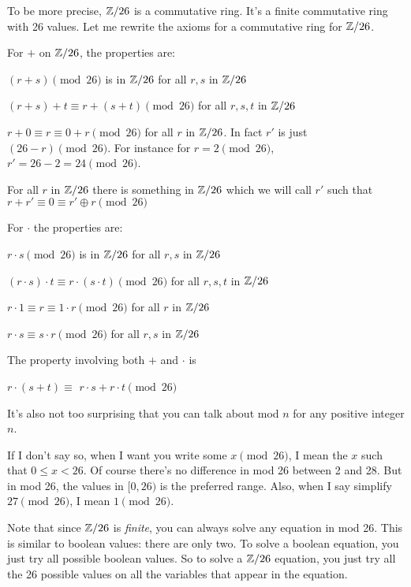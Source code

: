 To be more precise, $\mathbb Z/26$ is a commutative ring.
It's a finite commutative ring with 26 values.
Let me rewrite the axioms for a commutative ring for $\mathbb Z/26$.

For $+$ on $\mathbb Z/26$, the properties are:
\begin{myenum}
\item $(r + s) \pmod{26}$ is in $\mathbb Z/26$ for all $r,s$ in $\mathbb Z/26$
\item 
  $(r + s) + t
  \equiv
  r + (s + t) \pmod{26}$
for all $r,s,t$ in $\mathbb Z/26$
\item
$r + 0 \equiv r \equiv 0 + r \pmod{26}$ 
for all
$r$ in $\mathbb Z/26$.
In fact $r'$ is just $(26 - r) \pmod{26}$.
For instance for $r = 2 \pmod{26}$, $r' = 26 - 2 = 24 \pmod{26}$.
\item For 
all $r$ in $\mathbb Z/26$ there is something in $\mathbb Z/26$ which we will call $r'$
such that $r + r' \equiv 0 \equiv r' \oplus r \pmod{26}$
\end{myenum}

For $\cdot$ the properties are:
\begin{myenum}
\item $r \cdot s \pmod{26}$ is in $\mathbb Z/26$ for all $r, s$ in $\mathbb Z/26$
\item $(r \cdot s) \cdot t \equiv r \cdot (s \cdot t) \pmod{26}$ for all $r,s,t$ in $\mathbb Z/26$
\item $r \cdot 1 \equiv r \equiv 1 \cdot r \pmod{26}$ for all $r$ in $\mathbb Z/26$
\item $r \cdot s \equiv s \cdot r \pmod{26}$ for all $r,s$ in $\mathbb Z/26$ 
\end{myenum}
The property involving both $+$ and $\cdot$ is
\begin{myenum}
\item 
$r \cdot (s + t) \equiv$
$r \cdot s + r \cdot t \pmod{26}$
\end{myenum}

It's also not too surprising that you can talk about mod $n$ for any
positive integer $n$.

If I don't say so, when I want you write some $x \pmod{26}$, I mean the $x$
such that $0 \leq x < 26$.
Of course there's no difference in mod 26 between 2 and 28.
But in mod 26, the values in $[0, 26)$ is the preferred range.
Also, when I say simplify $27 \pmod{26}$, I mean $1 \pmod{26}$.

Note that since $\mathbb Z/26$ is \textit{finite}, you can always solve
any equation in mod 26.
This is similar to boolean values: there are only two.
To solve a boolean equation, you just try all possible boolean values.
So to solve a $\mathbb Z/26$ equation, you just try all the 26 possible
values on all the variables that appear in the equation.

